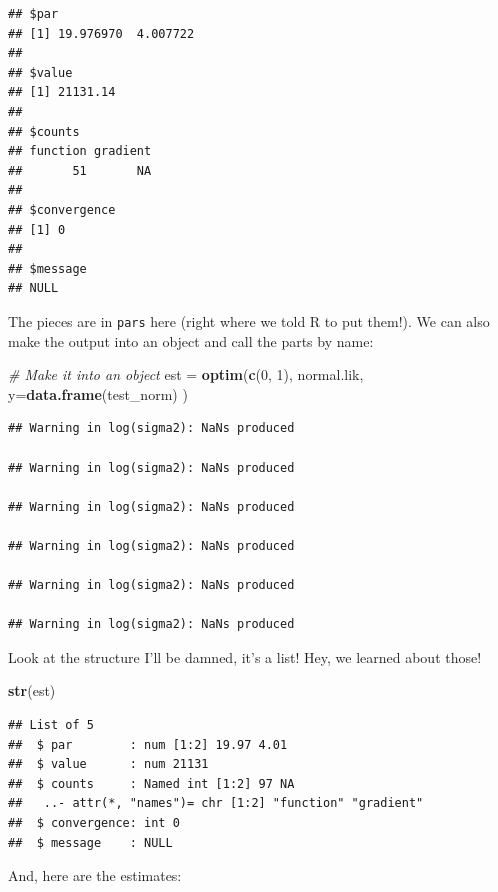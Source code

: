 \documentclass[
]{book}
\newenvironment{Shaded}{\begin{snugshade}}{\end{snugshade}}
\newcommand{\CommentTok}[1]{\textcolor[rgb]{0.56,0.35,0.01}{\textit{#1}}}
\newcommand{\DataTypeTok}[1]{\textcolor[rgb]{0.13,0.29,0.53}{#1}}
\newcommand{\DecValTok}[1]{\textcolor[rgb]{0.00,0.00,0.81}{#1}}
\newcommand{\KeywordTok}[1]{\textcolor[rgb]{0.13,0.29,0.53}{\textbf{#1}}}
\newcommand{\NormalTok}[1]{#1}
\newcommand{\OperatorTok}[1]{\textcolor[rgb]{0.81,0.36,0.00}{\textbf{#1}}}
\newcommand{\StringTok}[1]{\textcolor[rgb]{0.31,0.60,0.02}{#1}}
\begin{document}
\begin{verbatim}
## $par
## [1] 19.976970  4.007722
## 
## $value
## [1] 21131.14
## 
## $counts
## function gradient 
##       51       NA 
## 
## $convergence
## [1] 0
## 
## $message
## NULL
\end{verbatim}

The pieces are in \texttt{pars} here (right where we told R to put them!). We can also make the output into an object and call the parts by name:

\begin{Shaded}
\begin{Highlighting}[]
\CommentTok{# Make it into an object}
\NormalTok{est =}\StringTok{ }\KeywordTok{optim}\NormalTok{(}\KeywordTok{c}\NormalTok{(}\DecValTok{0}\NormalTok{, }\DecValTok{1}\NormalTok{),}
\NormalTok{            normal.lik,}
            \DataTypeTok{y=}\KeywordTok{data.frame}\NormalTok{(test_norm)}
\NormalTok{            ) }
\end{Highlighting}
\end{Shaded}

\begin{verbatim}
## Warning in log(sigma2): NaNs produced

## Warning in log(sigma2): NaNs produced

## Warning in log(sigma2): NaNs produced

## Warning in log(sigma2): NaNs produced

## Warning in log(sigma2): NaNs produced

## Warning in log(sigma2): NaNs produced
\end{verbatim}

Look at the structure I'll be damned, it's a list! Hey, we learned about those!

\begin{Shaded}
\begin{Highlighting}[]
\KeywordTok{str}\NormalTok{(est)   }
\end{Highlighting}
\end{Shaded}

\begin{verbatim}
## List of 5
##  $ par        : num [1:2] 19.97 4.01
##  $ value      : num 21131
##  $ counts     : Named int [1:2] 97 NA
##   ..- attr(*, "names")= chr [1:2] "function" "gradient"
##  $ convergence: int 0
##  $ message    : NULL
\end{verbatim}

And, here are the estimates:

\begin{Shaded}
\end{Shaded}
\end{document}

